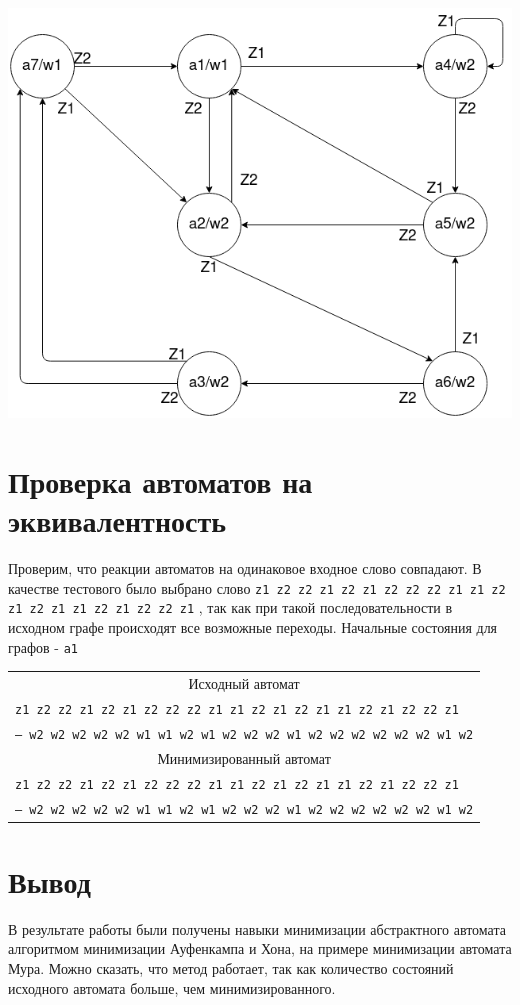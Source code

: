 \documentclass[12pt, a4paper]{article}
\begin{document}
\begin{center}
  \includegraphics[scale=0.4]{ta2_2}
\end{center}

\section*{Проверка автоматов на эквивалентность}

Проверим, что реакции автоматов на одинаковое входное слово совпадают. В
качестве тестового было выбрано слово \texttt{z1 z2 z2 z1 z2 z1 z2 z2 z2 z1 z1 z2 z1 z2 z1 z1 z2 z1 z2 z2 z1}
, так как при такой последовательности в исходном графе происходят все возможные
переходы. Начальные состояния для графов - \texttt{a1}

\begin{center}
\begin{tabular}{| l |}
  \hline
  \multicolumn{1}{|c|}{Исходный автомат}\\
  \texttt{z1 z2 z2 z1 z2 z1 z2 z2 z2 z1 z1 z2 z1 z2 z1 z1 z2 z1 z2 z2 z1}\\
  \texttt{-- w2 w2 w2 w2 w2 w1 w1 w2 w1 w2 w2 w2 w1 w2 w2 w2 w2 w2 w2 w1 w2}\\
  \hline
  \multicolumn{1}{|c|}{Минимизированный автомат}\\
  \texttt{z1 z2 z2 z1 z2 z1 z2 z2 z2 z1 z1 z2 z1 z2 z1 z1 z2 z1 z2 z2 z1}\\
  \texttt{-- w2 w2 w2 w2 w2 w1 w1 w2 w1 w2 w2 w2 w1 w2 w2 w2 w2 w2 w2 w1 w2}\\
  \hline
\end{tabular}
\end{center}

\section*{Вывод}

В результате работы были получены навыки минимизации абстрактного автомата
алгоритмом минимизации Ауфенкампа и Хона, на примере минимизации автомата Мура.
Можно сказать, что метод работает, так как количество состояний исходного
автомата больше, чем минимизированного.
\end{document}
